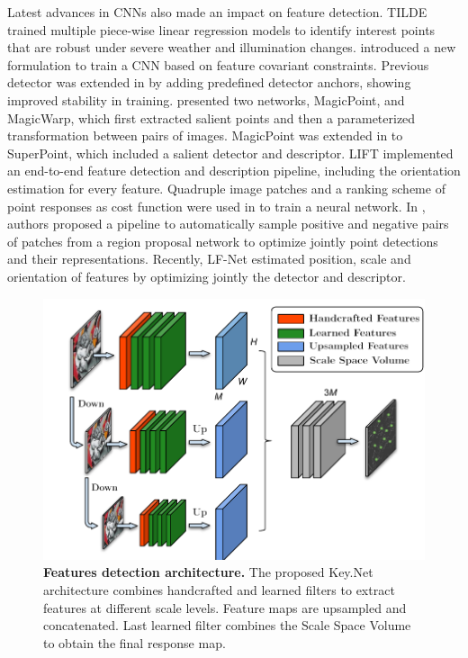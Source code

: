 Latest advances in CNNs also made an impact on feature detection. TILDE \cite{TILDE} trained multiple piece-wise linear regression models to identify interest points that are robust under severe weather and illumination changes. \cite{Karel_Vedaldi_ECCV_16} introduced a new formulation to train a CNN based on feature covariant constraints. 
Previous detector was extended in \cite{Zhang_Felix_CVPR_17} by adding predefined detector anchors, showing improved stability in training. \cite{DeTone_MagicPoint17} presented two networks, MagicPoint, and MagicWarp, which first extracted salient points and then a parameterized transformation between pairs of images. MagicPoint was extended in \cite{detone2017superpoint} to SuperPoint, which included a salient detector and descriptor.
LIFT \cite{LIFT} implemented an end-to-end feature detection and description pipeline, including the orientation estimation for every feature. Quadruple image patches and a ranking scheme of point responses as cost function were used in \cite{savinov2016quad} to train a neural network. In \cite{Georgakis_Karanam_CVPR18}, authors proposed a pipeline to automatically sample positive and negative pairs of patches from a region proposal network to optimize jointly point detections and their representations. Recently, LF-Net \cite{OnoSerra18} estimated position, scale and orientation of features by optimizing jointly the detector and descriptor.

\begin{figure}[!tbh]
\centering
\hspace*{-1cm}    
\includegraphics[width=\linewidth]{main/chapter02/figures/keynet_inference.pdf}
\vspace{-0.20cm}
\caption[Features detection architecture]{\textbf{Features detection architecture.} The proposed Key.Net architecture combines handcrafted and learned filters to extract features at different scale levels. Feature maps are upsampled and concatenated. Last learned filter combines the Scale Space Volume to obtain the final response map.}
\label{keynet_fig:net_architecture}
\end{figure}

